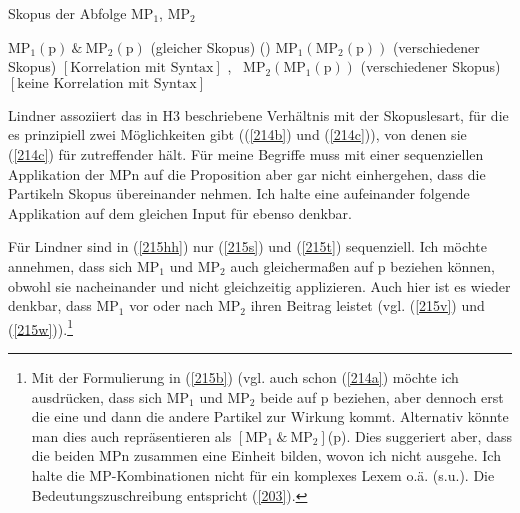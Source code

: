 \begin{exe}
	\ex\label{214} 
	Skopus der Abfolge $\textrm{MP}_{1}$, $\textrm{MP}_{2}$
		\begin{xlist}	
			\ex\label{214a} $\textrm{MP}_{1}(\textrm{p}) \ \& \ \textrm{MP}_{2}(\textrm{p})$ (gleicher Skopus) (\citealt{Thurmair1989, Thurmair1991})
			\ex\label{214b} $\textrm{MP}_{1}(\textrm{MP}_{2}(\textrm{p}))$ (verschiedener Skopus) $[\textrm{Korrelation mit Syntax}]$
			\newline 
			\hbox{}\hfill\hbox{\citet{Ormelius-Sandblom1997}, \citet{Rinas2007}}
			\ex\label{214c} $\textrm{MP}_{2}(\textrm{MP}_{1}(\textrm{p}))$ (verschiedener Skopus) $[\textrm{keine Korrelation mit Syntax}]$
			\newline
			\hbox{}\hfill\hbox{\citet{Lindner1991}}		
		\end{xlist}	
\end{exe}
Lindner assoziiert das in H3 beschriebene Verhältnis mit der Skopuslesart, für die es prinzipiell zwei Möglichkeiten gibt ((\ref{214b}) und (\ref{214c})), von denen sie (\ref{214c}) für zutreffender hält. Für meine Begriffe muss mit einer sequenziellen Applikation der MPn auf die Proposition aber gar nicht einhergehen, dass die Partikeln Skopus übereinander nehmen. Ich halte eine aufeinander folgende Applikation auf dem gleichen Input für ebenso denkbar. 

Für Lindner sind in (\ref{215hh}) nur (\ref{215s}) und (\ref{215t}) sequenziell. Ich möchte annehmen, dass sich $\textrm{MP}_{1}$ und $\textrm{MP}_{2}$ auch gleichermaßen auf p beziehen können, obwohl sie nacheinander und nicht gleichzeitig applizieren. Auch hier ist es wieder denkbar, dass $\textrm{MP}_{1}$ vor oder nach $\textrm{MP}_{2}$ ihren Beitrag leistet (vgl. (\ref{215v}) und (\ref{215w})).\footnote{Mit der Formulierung in (\ref{215b}) (vgl. auch schon (\ref{214a}) möchte ich ausdrücken, dass sich $\textrm{MP}_{1}$ und $\textrm{MP}_{2}$ beide auf p beziehen, aber dennoch erst die eine und dann die andere Partikel zur Wirkung kommt. Alternativ könnte man dies auch repräsentieren als $[\textrm{MP}_{1} \ \& \ \textrm{MP}_{2}]$(p). Dies suggeriert aber, dass die beiden MPn zusammen eine Einheit bilden, wovon ich nicht ausgehe. Ich halte die MP-Kombinationen nicht für ein komplexes Lexem o.ä. (s.u.). Die Bedeutungszuschreibung entspricht (\ref{203}).	
}

